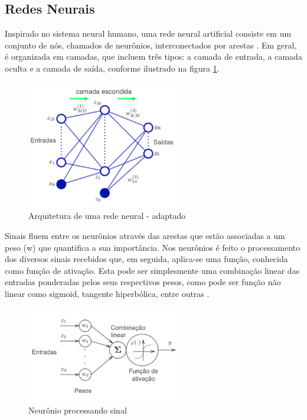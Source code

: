 \subsection{Redes Neurais}
Inspirado no sistema neural humano, uma rede neural artificial consiste em um conjunto de nós, chamados de neurônios, interconectados por arestas \cite{Bishop}. 
Em geral, é organizada em camadas, que incluem três tipos: a camada de entrada, a camada oculta e a camada de saída, conforme ilustrado na figura \ref{arqNN}.

\begin{figure}[H]
     \centering
     \includegraphics[width=0.6\textwidth]{figuras/RedeNeural.png}
     \caption[Arquitetura de rede neural]{Arquitetura de uma rede neural - \cite{Bishop} adaptado}
     \label{arqNN}
\end{figure}

Sinais fluem entre os neurônios através das arestas que estão associadas a um peso (w) que quantifica a sua importância. 
Nos neurônios é feito o processamento dos diversos sinais recebidos que, em seguida, aplica-se uma função, conhecida como função de ativação. 
Esta pode ser simplesmente uma combinação linear das entradas ponderadas pelos seus respectivos pesos, como pode ser função não linear como  sigmoid, 
tangente hiperbólica, entre outras \cite{Bishop}.   

\begin{figure}[H]
     \centering
     \includegraphics[width=0.6\textwidth]{figuras/ActivationFunc.png}
     \caption[Neurônio processando sinal]{Neurônio processando sinal \cite{Figueiredo}}
\end{figure}

